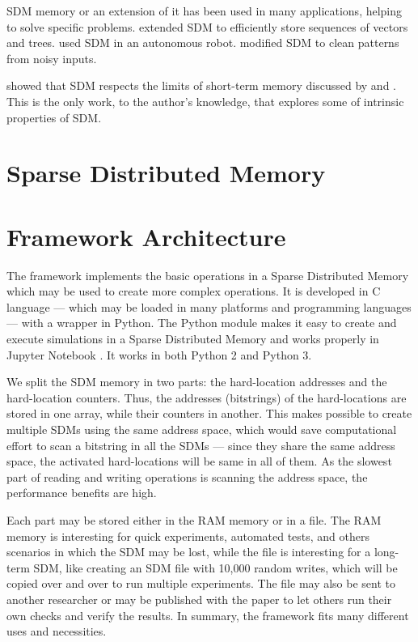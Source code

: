 SDM memory or an extension of it has been used in many applications, helping to solve specific problems. \citet{Snaider2011} extended SDM to efficiently store sequences of vectors and trees.  \citet{Rajesh1998} used SDM in an autonomous robot. \citet{Meng2009} modified SDM to clean patterns from noisy inputs.

\citet{Linhares2011} showed that SDM respects the limits of short-term memory discussed by \citet{Miller1955} and \citet{Cowan2001}. This is the only work, to the author's knowledge, that explores some of intrinsic properties of SDM.


\chapter{Sparse Distributed Memory}




\chapter{Framework Architecture}

The framework implements the basic operations in a Sparse Distributed Memory which may be used to create more complex operations. It is developed in C language --- which may be loaded in many platforms and programming languages --- with a wrapper in Python. The Python module makes it easy to create and execute simulations in a Sparse Distributed Memory and works properly in Jupyter Notebook \citep{kluyver2016jupyter}. It works in both Python 2 and Python 3.

We split the SDM memory in two parts: the hard-location addresses and the hard-location counters. Thus, the addresses (bitstrings) of the hard-locations are stored in one array, while their counters in another. This makes possible to create multiple SDMs using the same address space, which would save computational effort to scan a bitstring in all the SDMs --- since they share the same address space, the activated hard-locations will be same in all of them. As the slowest part of reading and writing operations is scanning the address space, the performance benefits are high.

Each part may be stored either in the RAM memory or in a file. The RAM memory is interesting for quick experiments, automated tests, and others scenarios in which the SDM may be lost, while the file is interesting for a long-term SDM, like creating an SDM file with 10,000 random writes, which will be copied over and over to run multiple experiments. The file may also be sent to another researcher or may be published with the paper to let others run their own checks and verify the results. In summary, the framework fits many different uses and necessities.

